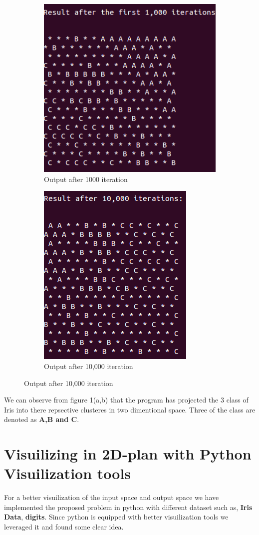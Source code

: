 \documentclass{article}
\begin{document}
\begin{figure}
\centering
\begin{subfigure}{0.5\textwidth}
  \centering
  \includegraphics[width=.5\linewidth]{i2.png}
   \caption{Output after 1000 iteration}
\end{subfigure}%
\begin{subfigure}{0.5\textwidth}
   \centering
  \includegraphics[width=0.5\linewidth]{i3.png}
  \caption{Output after 10,000 iteration}
\end{subfigure}
\end{figure}

We can observe from figure 1(a,b) that the program has projected the 3 class of
Iris into there repsective clusteres in two dimentional space. Three of the
class are denoted as \textbf{A,B and C}. 

\section{Visuilizing in 2D-plan with Python Visuilization tools}


For a better visuilization of the input space and output space we have
implemented the proposed problem in python with different dataset such as,
\textbf{Iris Data}, \textbf{digits}. Since python is equipped with better
visuilization tools we leveraged it and found some clear idea. 
\end{document}
